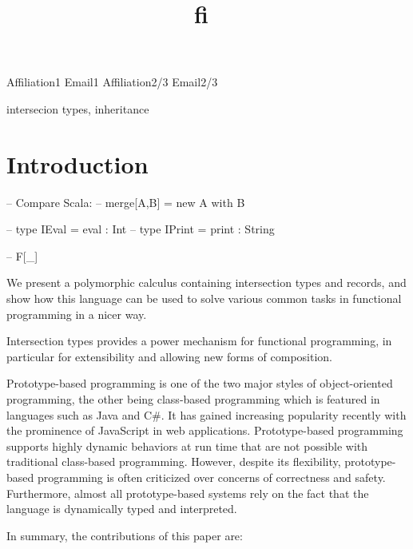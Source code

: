 \documentclass[preprint]{sigplanconf}
\newcommand{\name}{{\bf fi~}}
\begin{document}
\setlength{\pdfpageheight}{\paperheight}
\setlength{\pdfpagewidth}{\paperwidth}

\title{\name}

           {Affiliation1}
           {Email1}
           {Affiliation2/3}
           {Email2/3}

\maketitle

\begin{abstract}
\end{abstract}

\keywords
intersecion types, inheritance
\section{Introduction}

-- Compare Scala:
-- merge[A,B] = new A with B

-- type IEval  = { eval :  Int }
-- type IPrint = { print : String }

-- F[\_]

We present a polymorphic calculus containing intersection types and records, and show
how this language can be used to solve various common tasks in functional
programming in a nicer way.

Intersection types provides a power mechanism for functional programming, in
particular for extensibility and allowing new forms of composition.

Prototype-based programming is one of the two major styles of object-oriented
programming, the other being class-based programming which is featured in
languages such as Java and C\#. It has gained increasing popularity recently
with the prominence of JavaScript in web applications. Prototype-based
programming supports highly dynamic behaviors at run time that are not possible
with traditional class-based programming. However, despite its flexibility,
prototype-based programming is often criticized over concerns of correctness and
safety. Furthermore, almost all prototype-based systems rely on the fact that
the language is dynamically typed and interpreted.

In summary, the contributions of this paper are:
\end{document}
